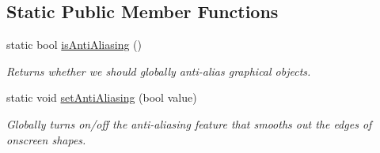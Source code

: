 \subsection*{Static Public Member Functions}
\begin{DoxyCompactItemize}
\item 
static bool \mbox{\hyperlink{classsgl_1_1GObject_a93be0e1fe1b1bf1a1da732470c94f42b}{is\+Anti\+Aliasing}} ()
\begin{DoxyCompactList}\small\item\em Returns whether we should globally anti-\/alias graphical objects. \end{DoxyCompactList}\item 
static void \mbox{\hyperlink{classsgl_1_1GObject_a1e43371668ae850193cebedb44e1bbe3}{set\+Anti\+Aliasing}} (bool value)
\begin{DoxyCompactList}\small\item\em Globally turns on/off the anti-\/aliasing feature that smooths out the edges of onscreen shapes. \end{DoxyCompactList}\end{DoxyCompactItemize}
